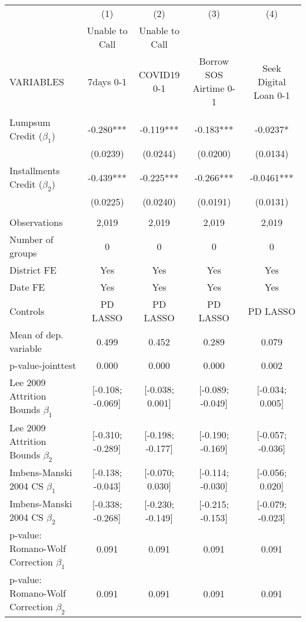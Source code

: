 \begin{tabular}{lcccc} \hline
 & (1) & (2) & (3) & (4) \\
 & Unable to Call & Unable to Call &  &  \\
VARIABLES & 7days 0-1 & COVID19 0-1 & Borrow SOS Airtime 0-1 & Seek Digital Loan 0-1 \\ \hline
 &  &  &  &  \\
Lumpsum Credit ($\beta_1$) & -0.280*** & -0.119*** & -0.183*** & -0.0237* \\
 & (0.0239) & (0.0244) & (0.0200) & (0.0134) \\
Installments Credit ($\beta_2$) & -0.439*** & -0.225*** & -0.266*** & -0.0461*** \\
 & (0.0225) & (0.0240) & (0.0191) & (0.0131) \\
 &  &  &  &  \\
Observations & 2,019 & 2,019 & 2,019 & 2,019 \\
Number of groups & 0 & 0 & 0 & 0 \\
District FE & Yes & Yes & Yes & Yes \\
Date FE & Yes & Yes & Yes & Yes \\
Controls & PD LASSO & PD LASSO & PD LASSO & PD LASSO \\
Mean of dep. variable & 0.499 & 0.452 & 0.289 & 0.079 \\
p-value-jointtest & 0.000 & 0.000 & 0.000 & 0.002 \\
Lee 2009 Attrition Bounds $\beta_1$ & [-0.108; -0.069] & [-0.038; 0.001] & [-0.089; -0.049] & [-0.034; 0.005] \\
Lee 2009 Attrition Bounds $\beta_2$ & [-0.310; -0.289] & [-0.198; -0.177] & [-0.190; -0.169] & [-0.057; -0.036] \\
Imbens-Manski 2004 CS $\beta_1$ & [-0.138; -0.043] & [-0.070; 0.030] & [-0.114; -0.030] & [-0.056; 0.020] \\
Imbens-Manski 2004 CS $\beta_2$ & [-0.338; -0.268] & [-0.230; -0.149] & [-0.215; -0.153] & [-0.079; -0.023] \\
p-value: Romano-Wolf Correction $\beta_1$ & 0.091 & 0.091 & 0.091 & 0.091 \\
 p-value: Romano-Wolf Correction $\beta_2$ & 0.091 & 0.091 & 0.091 & 0.091 \\ \hline
\end{tabular}
